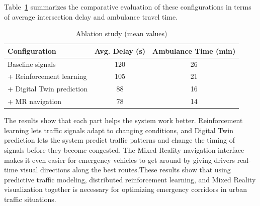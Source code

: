 \documentclass[conference]{IEEEtran}
\begin{document}
Table~\ref{tab:ablation} summarizes the comparative evaluation of these configurations in terms of average intersection delay and ambulance travel time.

\begin{table}[t]
\centering
\caption{Ablation study (mean values)}
\label{tab:ablation}
\scriptsize
\setlength{\tabcolsep}{5pt}
\renewcommand{\arraystretch}{1.05}
\begin{tabular}{lcc}
\toprule
Configuration & Avg. Delay (s) & Ambulance Time (min) \\
\midrule
Baseline signals & 120 & 26 \\
+ Reinforcement learning & 105 & 21 \\
+ Digital Twin prediction & 88 & 16 \\
+ MR navigation & 78 & 14 \\
\bottomrule
\end{tabular}
\end{table}

The results show that each part helps the system work better. Reinforcement learning lets traffic signals adapt to changing conditions, and Digital Twin prediction lets the system predict traffic patterns and change the timing of signals before they become congested. The Mixed Reality navigation interface makes it even easier for emergency vehicles to get around by giving drivers real-time visual directions along the best routes.These results show that using predictive traffic modeling, distributed reinforcement learning, and Mixed Reality visualization together is necessary for optimizing emergency corridors in urban traffic situations.
\end{document}
